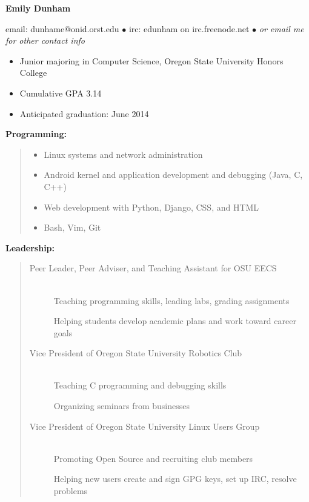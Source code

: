 \documentclass[11pt]{article}
\begin{document}
\centerline{{\LARGE \bf Emily Dunham}}

\bigskip

\centerline{email: dunhame@onid.orst.edu
        $\bullet$
        irc: edunham on irc.freenode.net
        $\bullet$
        \emph{or email me for other contact info}}

\hrulefill

\bigskip

\begin{itemize}

    \item Junior majoring in Computer Science, Oregon State University 
          Honors College

    \item Cumulative GPA 3.14

    \item Anticipated graduation: June 2014

\end{itemize}

\bigskip
\hrulefill
\smallskip


\smallskip

{\large \bf Programming:}
\begin{quote}
\begin{itemize}
    \item Linux systems and network administration
    \item Android kernel and application development and debugging (Java, C, C++)
    \item Web development with Python, Django, CSS, and HTML
    \item Bash, Vim, Git
\end{itemize}
\end{quote}

{\large \bf Leadership:}
\begin{quote}
\begin{description}
    \item[Peer Leader, Peer Adviser, and Teaching Assistant for OSU EECS]
        \hfill \\ 
        Teaching programming skills, leading labs, grading assignments
        
        Helping students develop academic plans and work toward career goals

    \item[Vice President of Oregon State University Robotics Club]
        \hfill \\
        Teaching C programming and debugging skills

        Organizing seminars from businesses

    \item[Vice President of Oregon State University Linux Users Group]
        \hfill \\
        Promoting Open Source and recruiting club members

        Helping new users create and sign GPG keys, set up IRC, resolve problems
\end{description}
\end{quote}
\end{document}
